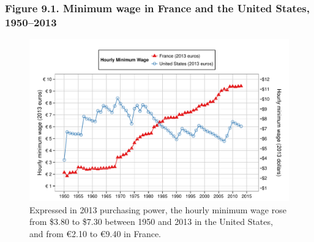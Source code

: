 \documentclass[t]{beamer}\usepackage[]{graphicx}\usepackage[]{color}
\newenvironment{knitrout}{}{} %
\begin{document}
\begin{frame}[label=Figure_9_1]
\frametitle{Figure 9.1. Minimum wage in France and the United States, 1950--2013}
\begin{figure}[t]
\begin{minipage}[b]{\textwidth}
\centering

\begin{knitrout}\footnotesize
{}\color{fgcolor}

{\centering \includegraphics[width=1\linewidth]{figures/color/Figure_9_1} 

}



\end{knitrout}
\caption{Expressed in 2013 purchasing power, the hourly minimum wage rose from \$3.80 to \$7.30 between 1950 and 2013 in the United States, and from \euro 2.10 to \euro 9.40 in France.}
\end{minipage}
\end{figure}
\end{frame}
\end{document}
